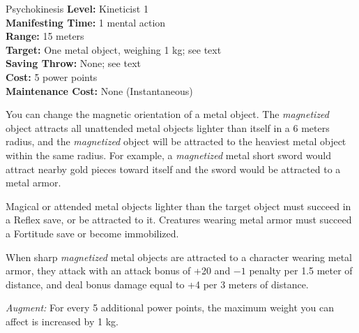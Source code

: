 {Psychokinesis}
{
	\textbf{Level:}
	Kineticist 1\\
	\textbf{Manifesting Time:}
	1 mental action\\
	\textbf{Range:}
	15 meters\\
	\textbf{Target:}
	One metal object, weighing 1 kg; see text\\
	\textbf{Saving Throw:}
	None; see text\\
	\textbf{Cost:}
	5 power points\\
	\textbf{Maintenance Cost:}
	None (Instantaneous)\\
}
{
	You can change the magnetic orientation of a metal object. The \emph{magnetized} object attracts all unattended metal objects lighter than itself in a 6 meters radius, and the \emph{magnetized} object will be attracted to the heaviest metal object within the same radius. For example, a \emph{magnetized} metal short sword would attract nearby gold pieces toward itself and the sword would be attracted to a metal armor.

	Magical or attended metal objects lighter than the target object must succeed in a Reflex save, or be attracted to it. Creatures wearing metal armor must succeed a Fortitude save or become immobilized.

	When sharp \emph{magnetized} metal objects are attracted to a character wearing metal armor, they attack with an attack bonus of +20 and $-1$ penalty per 1.5 meter of distance, and deal bonus damage equal to +4 per 3 meters of distance.

	\textit{Augment:} For every 5 additional power points, the maximum weight you can affect is increased by 1 kg.
}
